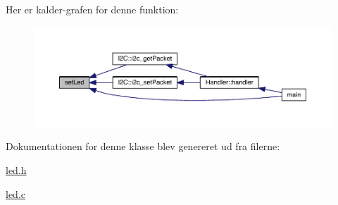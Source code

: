 Her er kalder-\/grafen for denne funktion\+:\nopagebreak
\begin{figure}[H]
\begin{center}
\leavevmode
\includegraphics[width=350pt]{class_l_e_d_a1d8e725e3829da99c1d027ba0a2ce57a_icgraph}
\end{center}
\end{figure}




Dokumentationen for denne klasse blev genereret ud fra filerne\+:\begin{DoxyCompactItemize}
\item 
\hyperlink{led_8h}{led.\+h}\item 
\hyperlink{led_8c}{led.\+c}\end{DoxyCompactItemize}
